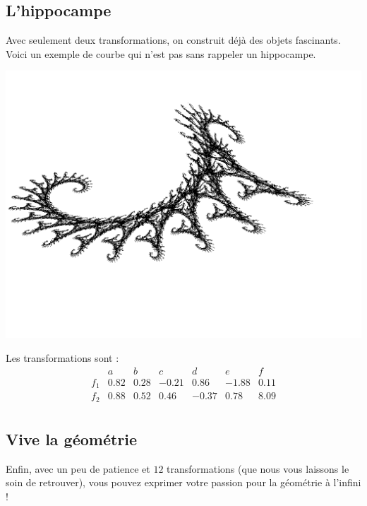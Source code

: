 \documentclass[11pt,class=report,crop=false]{standalone}
\begin{document}
\subsection{L'hippocampe}

Avec seulement deux transformations, on construit déjà des objets fascinants.
Voici un exemple de courbe qui n'est pas sans rappeler un hippocampe.

\begin{center}
 \includegraphics[scale=.5]{images/IFS-dragon1bis.png} 
\end{center}

Les transformations sont :
\begin{displaymath}
\begin{array}{c|cccccc}
     & a & b & c & d & e & f \\
\hline
f_1 & 0.82 & 0.28 & -0.21 & 0.86 & -1.88 & 0.11 \\
\hline
f_2  & 0.88 & 0.52 & 0.46 & -0.37 & 0.78 & 8.09 \\
\end{array}
\end{displaymath}

\subsection{Vive la géométrie}

Enfin, avec un peu de patience et $12$ transformations (que nous vous laissons le soin de retrouver),
vous pouvez exprimer votre passion pour la géométrie à l'infini !
\end{document}
